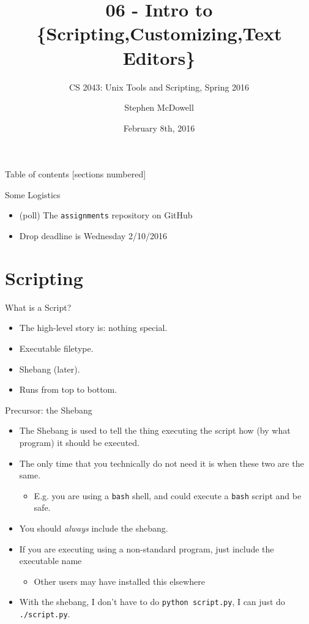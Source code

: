 \documentclass[11pt]{beamer}
\title{06 \-- Intro to \{Scripting,Customizing,Text Editors\}}
\subtitle{CS 2043: Unix Tools and Scripting, Spring 2016 \cite{prevSemesters}}
\date{February 8th, 2016}
\author{Stephen McDowell}
\institute{Cornell University}
\begin{document}
\maketitle

\begin{frame}{Table of contents}
  [sections numbered]
  \tableofcontents[hideallsubsections]
\end{frame}

\begin{frame}{Some Logistics}
  \begin{itemize}[<+- | alert@+>]
    \item (poll) The \texttt{assignments} repository on GitHub
    \item Drop deadline is Wednesday 2/10/2016
  \end{itemize}
\end{frame}

%
\section{Scripting}
\label{sec:scripting}

\begin{frame}[fragile]{What is a Script?}
  \begin{itemize}[<+- | alert@+>]
    \item The high-level story is: nothing special.
    \item Executable filetype.
    \item Shebang (later).
    \item Runs from top to bottom.
  \end{itemize}
\end{frame}

\begin{frame}[fragile]{Precursor: the Shebang}
  \begin{itemize}[<+- | alert@+>]
    \item The Shebang\cite{shebang} is used to tell the thing executing the script how (by what program) it should be executed.
    \item The only time that you technically do not need it is when these two are the same.
    \begin{itemize}[<+- | alert@+>]
      \item E.g. you are using a \texttt{bash} shell, and could execute a \texttt{bash} script and be safe.
    \end{itemize}
    \item You should \emph{always} include the shebang.
    \item If you are executing using a non-standard program, just include the executable name
    \begin{itemize}[<+- | alert@+>]
      \item Other users may have installed this elsewhere
    \end{itemize}
    \item With the shebang, I don't have to do \texttt{python script.py}, I can just do \texttt{./script.py}.
  \end{itemize}
\end{frame}
\end{document}
